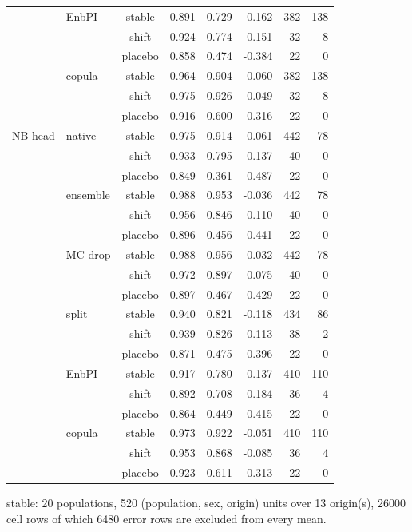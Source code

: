 {\begin{longtable}{@{}llcrrrrr@{}}
 & EnbPI & stable & 0.891 & 0.729 & -0.162 & 382 & 138 \\
 &  & shift & 0.924 & 0.774 & -0.151 & 32 & 8 \\
 &  & placebo & 0.858 & 0.474 & -0.384 & 22 & 0 \\
 & copula & stable & 0.964 & 0.904 & -0.060 & 382 & 138 \\
 &  & shift & 0.975 & 0.926 & -0.049 & 32 & 8 \\
 &  & placebo & 0.916 & 0.600 & -0.316 & 22 & 0 \\
\addlinespace[2pt]
NB head & native & stable & 0.975 & 0.914 & -0.061 & 442 & 78 \\
 &  & shift & 0.933 & 0.795 & -0.137 & 40 & 0 \\
 &  & placebo & 0.849 & 0.361 & -0.487 & 22 & 0 \\
 & ensemble & stable & 0.988 & 0.953 & -0.036 & 442 & 78 \\
 &  & shift & 0.956 & 0.846 & -0.110 & 40 & 0 \\
 &  & placebo & 0.896 & 0.456 & -0.441 & 22 & 0 \\
 & MC-drop & stable & 0.988 & 0.956 & -0.032 & 442 & 78 \\
 &  & shift & 0.972 & 0.897 & -0.075 & 40 & 0 \\
 &  & placebo & 0.897 & 0.467 & -0.429 & 22 & 0 \\
 & split & stable & 0.940 & 0.821 & -0.118 & 434 & 86 \\
 &  & shift & 0.939 & 0.826 & -0.113 & 38 & 2 \\
 &  & placebo & 0.871 & 0.475 & -0.396 & 22 & 0 \\
 & EnbPI & stable & 0.917 & 0.780 & -0.137 & 410 & 110 \\
 &  & shift & 0.892 & 0.708 & -0.184 & 36 & 4 \\
 &  & placebo & 0.864 & 0.449 & -0.415 & 22 & 0 \\
 & copula & stable & 0.973 & 0.922 & -0.051 & 410 & 110 \\
 &  & shift & 0.953 & 0.868 & -0.085 & 36 & 4 \\
 &  & placebo & 0.923 & 0.611 & -0.313 & 22 & 0 \\
\end{longtable}
\noindent\begin{minipage}{\linewidth}\scriptsize\raggedright
\noindent stable: 20 populations, 520 (population, sex, origin) units over 13 origin(s), 26000 cell rows of which 6480 error rows are excluded from every mean.\par

\end{minipage}}
